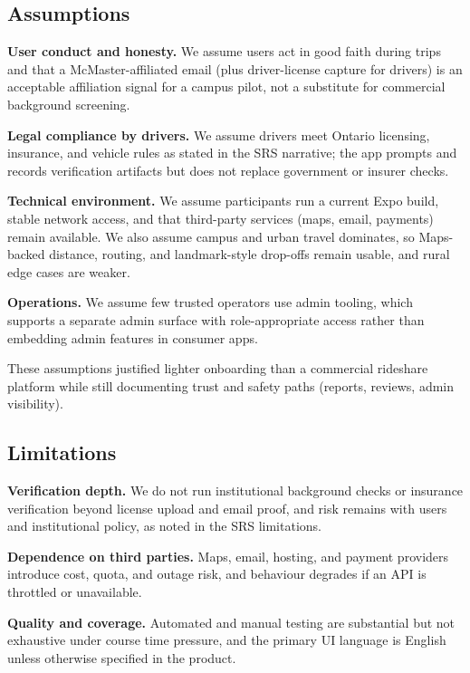 \documentclass{article}
\begin{document}
\subsection{Assumptions}

\noindent\textbf{User conduct and honesty.} We assume users act in good faith during trips and that a McMaster-affiliated email (plus driver-license capture for drivers) is an acceptable affiliation signal for a campus pilot, not a substitute for commercial background screening.

\noindent\textbf{Legal compliance by drivers.} We assume drivers meet Ontario licensing, insurance, and vehicle rules as stated in the SRS narrative; the app prompts and records verification artifacts but does not replace government or insurer checks.

\noindent\textbf{Technical environment.} We assume participants run a current Expo build, stable network access, and that third-party services (maps, email, payments) remain available. We also assume campus and urban travel dominates, so Maps-backed distance, routing, and landmark-style drop-offs remain usable, and rural edge cases are weaker.

\noindent\textbf{Operations.} We assume few trusted operators use admin tooling, which supports a separate admin surface with role-appropriate access rather than embedding admin features in consumer apps.

\noindent These assumptions justified lighter onboarding than a commercial rideshare platform while still documenting trust and safety paths (reports, reviews, admin visibility).

\subsection{Limitations}

\noindent\textbf{Verification depth.} We do not run institutional background checks or insurance verification beyond license upload and email proof, and risk remains with users and institutional policy, as noted in the SRS limitations.

\noindent\textbf{Dependence on third parties.} Maps, email, hosting, and payment providers introduce cost, quota, and outage risk, and behaviour degrades if an API is throttled or unavailable.

\noindent\textbf{Quality and coverage.} Automated and manual testing are substantial but not exhaustive under course time pressure, and the primary UI language is English unless otherwise specified in the product.
\end{document}
